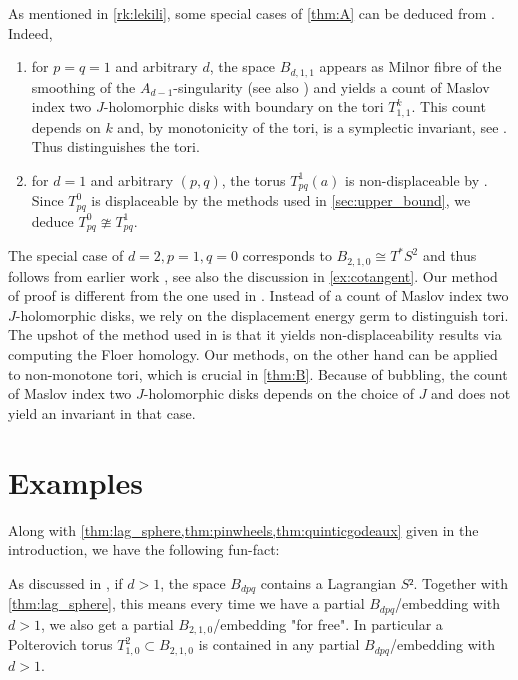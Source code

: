 \documentclass[12pt,a4paper,abstract=true,final]{scrartcl}
\begin{document}
\begin{remark}
    \label{rk:lekili2}
    As mentioned in \cref{rk:lekili}, some special cases of \cref{thm:A} can be deduced from \cite{LekMay14}. Indeed, 
    \begin{enumerate}
        \item for $p = q = 1$ and arbitrary $d$, the space $B_{d,1,1}$ appears as Milnor fibre of the smoothing of the $A_{d-1}$-singularity (see also \cite[Section 7.3]{evans2021atfs}) and \cite[Lemma 2.19]{LekMay14} yields a count of Maslov index two $J$-holomorphic disks with boundary on the tori $T^k_{1,1}$. This count depends on $k$ and, by monotonicity of the tori, is a symplectic invariant, see \cite{EliPol97}. Thus \cite[Lemma 2.19]{LekMay14} distinguishes the tori.
        \item for $d = 1$ and arbitrary $(p,q)$, the torus $T^1_{pq}(a)$ is non-displaceable by \cite[Proposition 3.6]{LekMay14}. Since $T^0_{pq}$ is displaceable by the methods used in \cref{sec:upper_bound}, we deduce $T^0_{pq} \ncong T^1_{pq}$.
    \end{enumerate}
    The special case of $d=2,p=1,q=0$ corresponds to $B_{2,1,0} \cong T^*S^2$ and thus follows from earlier work \cite{AlbFra08}, see also the discussion in \cref{ex:cotangent}.
    Our method of proof is different from the one used in \cite{LekMay14}.
    Instead of a count of Maslov index two $J$-holomorphic disks, we rely on the displacement energy germ to distinguish tori.
    The upshot of the method used in \cite{LekMay14} is that it yields non-displaceability results via computing the Floer homology.
    Our methods, on the other hand can be applied to non-monotone tori, which is crucial in \cref{thm:B}. Because of bubbling, the count of Maslov index two $J$-holomorphic disks depends on the choice of $J$ and does not yield an invariant in that case.
\end{remark}

\section{Examples}
\label{sec:examples}

Along with \cref{thm:lag_sphere,thm:pinwheels,thm:quinticgodeaux} given in the introduction, we have the following fun-fact:

As discussed in \cite[Remark 7.10]{evans2021atfs}, if $d>1$, the space $B_{dpq}$ contains a Lagrangian $S²$.
Together with \cref{thm:lag_sphere}, this means every time we have a partial $B_{dpq}$\-/embedding with $d>1$, we also get a partial $B_{2,1,0}$\-/embedding "for free".
In particular a Polterovich torus $T^2_{1,0} ⊂ B_{2,1,0}$ is contained in any partial $B_{dpq}$\-/embedding with $d>1$.
\end{document}
